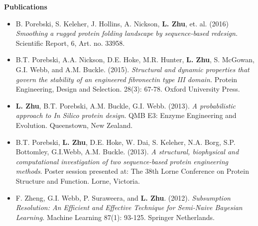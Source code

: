 \documentclass[a4paper,8pt,final]{memoir}
\newcommand{\Sep}{\vspace{1.5em}}
\newcommand{\SmallSep}{\vspace{0.5em}}
\newcommand{\CVSection}[1]
	{\Large\textbf{#1}\par
	\SmallSep\normalsize\normalfont}
\begin{document}
\clearpage
\framebreak
\framebreak

\CVSection{Publications}
\begin{itemize}
    \item B. Porebski, S. Keleher, J. Hollins, A. Nickson, \textbf{L. Zhu}, et. al. (2016) \textit{Smoothing a rugged protein folding landscape by sequence-based redesign.} Scientific Report, 6, Art. no. 33958.
    \item B.T. Porebski, A.A. Nickson, D.E. Hoke, M.R. Hunter, \textbf{L. Zhu}, S. McGowan, G.I. Webb, and A.M. Buckle. (2015). \textit{Structural and dynamic properties that govern the stability of an engineered fibronectin type III domain.} Protein Engineering, Design and Selection. 28(3): 67-78. Oxford University Press.
    \item \textbf{L. Zhu}, B.T. Porebski, A.M. Buckle, G.I. Webb. (2013). \textit{A probabilistic approach to In Silico protein design}. QMB E3: Enzyme Engineering and Evolution. Queenstown, New Zealand.
    \item B.T. Porebski, \textbf{L. Zhu}, D.E. Hoke, W. Dai, S. Keleher, N.A. Borg, S.P. Bottomley, G.I.Webb, A.M. Buckle. (2013). \textit{A structural, biophysical and computational investigation of two sequence-based protein engineering methods}. Poster session presented at: The 38th Lorne Conference on Protein Structure and Function. Lorne, Victoria.
    \item F. Zheng, G.I. Webb, P. Suraweera, and \textbf{L. Zhu}. (2012). \textit{Subsumption Resolution: An Efficient and Effective Technique for Semi-Naive Bayesian Learning.} Machine Learning 87(1): 93-125. Springer Netherlands.
\end{itemize}
\Sep


\end{document}
